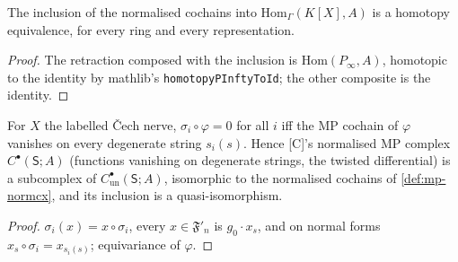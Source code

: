 \begin{theorem}\label{thm:mp-norm-heq}
  \leanok
  The inclusion of the normalised cochains into $\mathrm{Hom}_\Gamma(K[X],A)$ is a homotopy equivalence, for every ring and every
  representation.
\end{theorem}
\begin{proof}
  \leanok
  The retraction composed with the inclusion is $\mathrm{Hom}(P_\infty,A)$, homotopic to the identity by mathlib's
  \texttt{homotopyPInftyToId}; the other composite is the identity.
\end{proof}

\begin{theorem}\label{thm:mp-norm-dgn}
  \leanok
  For $X$ the labelled Čech nerve, $\sigma_i\circ\varphi=0$ for all $i$ iff the MP cochain of $\varphi$ vanishes on every degenerate string
  $s_i(s)$.  Hence [C]'s normalised MP complex $C^\bullet(\mathsf S;A)$ (functions vanishing on degenerate strings, the twisted
  differential) is a subcomplex of $C^\bullet_{\mathrm{un}}(\mathsf S;A)$, isomorphic to the normalised cochains of \ref{def:mp-normcx}, and its
  inclusion is a quasi-isomorphism.
\end{theorem}
\begin{proof}
  \leanok
  $\sigma_i(x)=x\circ\sigma_i$, every $x\in\mathfrak F'_n$ is $g_0\cdot x_s$, and on normal forms $x_s\circ\sigma_i=x_{s_i(s)}$; equivariance of $\varphi$.
\end{proof}

